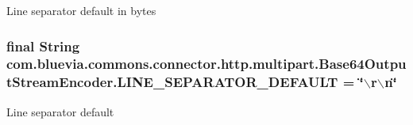 Line separator default in bytes \hypertarget{classcom_1_1bluevia_1_1commons_1_1connector_1_1http_1_1multipart_1_1Base64OutputStreamEncoder_ac7ff94c6398398174d06a7c21f0ebf15}{
\subsubsection[{LINE\_\-SEPARATOR\_\-DEFAULT}]{\setlength{\rightskip}{0pt plus 5cm}final String {\bf com.bluevia.commons.connector.http.multipart.Base64OutputStreamEncoder.LINE\_\-SEPARATOR\_\-DEFAULT} = \char`\"{}$\backslash$r$\backslash$n\char`\"{}}}
\label{classcom_1_1bluevia_1_1commons_1_1connector_1_1http_1_1multipart_1_1Base64OutputStreamEncoder_ac7ff94c6398398174d06a7c21f0ebf15}
Line separator default 
